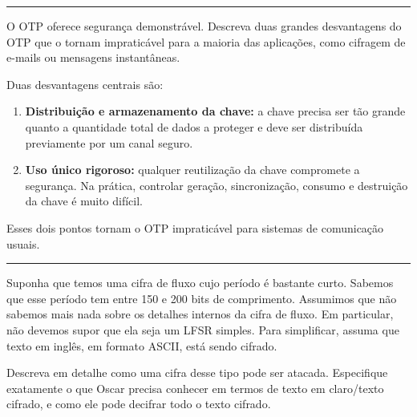 \documentclass[12pt,a4paper]{article}
\newcommand{\exercicio}[1]{%
    \par\vspace{1.2em}
    \noindent
    {\color{black!55}\rule[-0.25em]{3pt}{1.6em}}%
    \hspace{0.6em}{\Large\bfseries Exerc\'{i}cio #1}
    \par\vspace{-0.4em}
    \noindent{\color{black!35}\rule{\textwidth}{0.4pt}}
    \par\vspace{0.35em}
}
\newenvironment{resposta}{%
    \begin{respostabox}
    \color{red!70!black}\sloppy
}{%
    \end{respostabox}
}
\begin{document}
\exercicio{6}
O OTP oferece segurança demonstrável. Descreva duas grandes desvantagens do OTP que o tornam impraticável para a maioria das aplicações, como cifragem de e-mails ou mensagens instantâneas.

\begin{resposta}

Duas desvantagens centrais são:

\begin{enumerate}[label=\arabic*.]
    \item \textbf{Distribuição e armazenamento da chave:} a chave precisa ser tão grande quanto a quantidade total de dados a proteger e deve ser distribuída previamente por um canal seguro.
    \item \textbf{Uso único rigoroso:} qualquer reutilização da chave compromete a segurança. Na prática, controlar geração, sincronização, consumo e destruição da chave é muito difícil.
\end{enumerate}

Esses dois pontos tornam o OTP impraticável para sistemas de comunicação usuais.
\end{resposta}

\exercicio{7}
Suponha que temos uma cifra de fluxo cujo período é bastante curto. Sabemos que esse período tem entre 150 e 200 bits de comprimento. Assumimos que não sabemos mais nada sobre os detalhes internos da cifra de fluxo. Em particular, não devemos supor que ela seja um LFSR simples. Para simplificar, assuma que texto em inglês, em formato ASCII, está sendo cifrado.

Descreva em detalhe como uma cifra desse tipo pode ser atacada. Especifique exatamente o que Oscar precisa conhecer em termos de texto em claro/texto cifrado, e como ele pode decifrar todo o texto cifrado.
\end{document}
